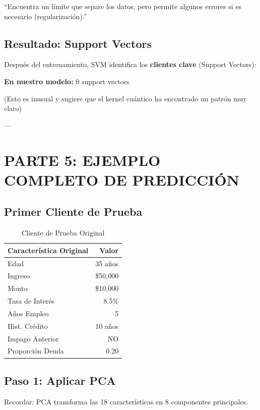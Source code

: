 \documentclass[11pt,a4paper,spanish]{article}
\begin{document}
``Encuentra un límite que separe los datos, pero permite algunos errores si es necesario (regularización).''

\subsection{Resultado: Support Vectors}

Después del entrenamiento, SVM identifica los \textbf{clientes clave} (Support Vectors):

\textbf{En nuestro modelo:} 0 support vectors

(Esto es inusual y sugiere que el kernel cuántico ha encontrado un patrón muy claro)

---

\section{PARTE 5: EJEMPLO COMPLETO DE PREDICCIÓN}

\subsection{Primer Cliente de Prueba}

\begin{table}[H]
\centering
\begin{tabular}{|l|r|}
\hline
\textbf{Característica Original} & \textbf{Valor} \\
\hline
Edad & 35 años \\
Ingreso & \$50,000 \\
Monto & \$10,000 \\
Tasa de Interés & 8.5\% \\
Años Empleo & 5 \\
Hist. Crédito & 10 años \\
Impago Anterior & NO \\
Proporción Deuda & 0.20 \\
\hline
\end{tabular}
\caption{Cliente de Prueba Original}
\end{table}

\subsection{Paso 1: Aplicar PCA}

Recordar: PCA transforma las 18 características en 8 componentes principales.
\end{document}
